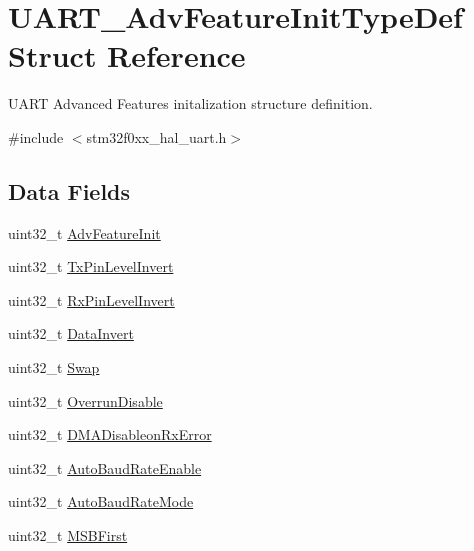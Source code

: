\hypertarget{struct_u_a_r_t___adv_feature_init_type_def}{}\section{U\+A\+R\+T\+\_\+\+Adv\+Feature\+Init\+Type\+Def Struct Reference}
\label{struct_u_a_r_t___adv_feature_init_type_def}


U\+A\+RT Advanced Features initalization structure definition.  




{\ttfamily \#include $<$stm32f0xx\+\_\+hal\+\_\+uart.\+h$>$}

\subsection*{Data Fields}
\begin{DoxyCompactItemize}
\item 
uint32\+\_\+t \hyperlink{struct_u_a_r_t___adv_feature_init_type_def_ad3ebc9a49be4aa143250abfbe6c427d1}{Adv\+Feature\+Init}
\item 
uint32\+\_\+t \hyperlink{struct_u_a_r_t___adv_feature_init_type_def_a60e165495975a7d568a8ffad4e8d8d82}{Tx\+Pin\+Level\+Invert}
\item 
uint32\+\_\+t \hyperlink{struct_u_a_r_t___adv_feature_init_type_def_aac4de1a4e7a0036f074a66c3bdc81322}{Rx\+Pin\+Level\+Invert}
\item 
uint32\+\_\+t \hyperlink{struct_u_a_r_t___adv_feature_init_type_def_a1feb1398f541e95a819aea3aed2d7552}{Data\+Invert}
\item 
uint32\+\_\+t \hyperlink{struct_u_a_r_t___adv_feature_init_type_def_ac584fd738a8eca4af2f92cd10d593ab0}{Swap}
\item 
uint32\+\_\+t \hyperlink{struct_u_a_r_t___adv_feature_init_type_def_a482f50369e2e24a560b9fd8db7b23aae}{Overrun\+Disable}
\item 
uint32\+\_\+t \hyperlink{struct_u_a_r_t___adv_feature_init_type_def_a8ebe515413b9d135fc10d8b6d7a81ac9}{D\+M\+A\+Disableon\+Rx\+Error}
\item 
uint32\+\_\+t \hyperlink{struct_u_a_r_t___adv_feature_init_type_def_aa0294d5e5601064664be71c10a9601c2}{Auto\+Baud\+Rate\+Enable}
\item 
uint32\+\_\+t \hyperlink{struct_u_a_r_t___adv_feature_init_type_def_a428166055c9499e0753a75703aeadae5}{Auto\+Baud\+Rate\+Mode}
\item 
uint32\+\_\+t \hyperlink{struct_u_a_r_t___adv_feature_init_type_def_a4533506da01ae4e82bf4dd7211fb1c45}{M\+S\+B\+First}
\end{DoxyCompactItemize}


